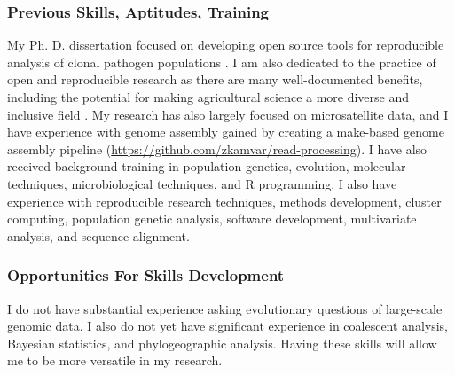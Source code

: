 \documentclass[12pt,letterpaper]{article}
\begin{document}
\subsubsection*{Previous Skills, Aptitudes, Training}

My Ph. D. dissertation focused on developing open source tools for reproducible analysis of clonal pathogen populations \citep{kamvar2014poppr}. 
I am also dedicated to the practice of open and reproducible research as there are many well-documented benefits, including the potential for making agricultural science a more diverse and inclusive field \citep{whitaker2017publishing,boettiger2015introduction}. 
My research has also largely focused on microsatellite data, and I have experience with genome assembly gained by creating a make-based genome assembly pipeline (\url{https://github.com/zkamvar/read-processing}). 
I have also received background training in population genetics, evolution, molecular techniques, microbiological techniques, and R programming. 
I also have experience with reproducible research techniques, methods development, cluster computing, population genetic analysis, software development, multivariate analysis, and sequence alignment. 

\subsubsection*{Opportunities For Skills Development}

I do not have substantial experience asking evolutionary questions of large-scale genomic data. 
I also do not yet have significant experience in coalescent analysis, Bayesian statistics, and phylogeographic analysis.
Having these skills will allow me to be more versatile in my research.


\end{document}
